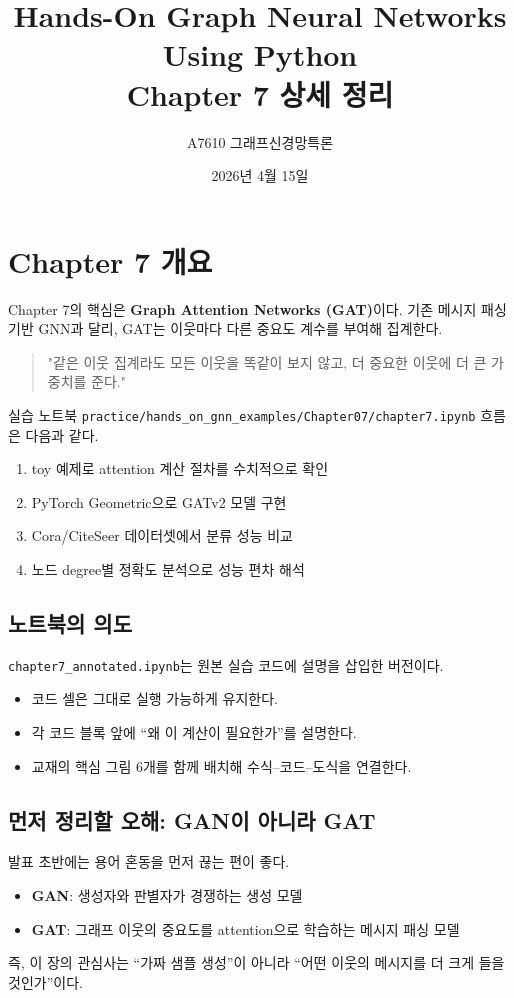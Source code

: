 \documentclass[11pt,a4paper]{article}
\title{Hands-On Graph Neural Networks Using Python\\Chapter 7 상세 정리}
\author{A7610 그래프신경망특론}
\date{2026년 4월 15일}
\begin{document}
\maketitle
\tableofcontents
\newpage

\section{Chapter 7 개요}

Chapter 7의 핵심은 \textbf{Graph Attention Networks (GAT)}이다. 기존 메시지 패싱 기반 GNN과 달리, GAT는 이웃마다 다른 중요도 계수를 부여해 집계한다.

\begin{quote}
"같은 이웃 집계라도 모든 이웃을 똑같이 보지 않고, 더 중요한 이웃에 더 큰 가중치를 준다."
\end{quote}

실습 노트북 \texttt{practice/hands\_on\_gnn\_examples/Chapter07/chapter7.ipynb} 흐름은 다음과 같다.
\begin{enumerate}[leftmargin=*]
  \item toy 예제로 attention 계산 절차를 수치적으로 확인
  \item PyTorch Geometric으로 GATv2 모델 구현
  \item Cora/CiteSeer 데이터셋에서 분류 성능 비교
  \item 노드 degree별 정확도 분석으로 성능 편차 해석
\end{enumerate}

\subsection*{노트북의 의도}
\texttt{chapter7\_annotated.ipynb}는 원본 실습 코드에 설명을 삽입한 버전이다.
\begin{itemize}[leftmargin=*]
  \item 코드 셀은 그대로 실행 가능하게 유지한다.
  \item 각 코드 블록 앞에 ``왜 이 계산이 필요한가''를 설명한다.
  \item 교재의 핵심 그림 6개를 함께 배치해 수식--코드--도식을 연결한다.
\end{itemize}

\subsection*{먼저 정리할 오해: GAN이 아니라 GAT}
발표 초반에는 용어 혼동을 먼저 끊는 편이 좋다.
\begin{itemize}[leftmargin=*]
  \item \textbf{GAN}: 생성자와 판별자가 경쟁하는 생성 모델
  \item \textbf{GAT}: 그래프 이웃의 중요도를 attention으로 학습하는 메시지 패싱 모델
\end{itemize}
즉, 이 장의 관심사는 ``가짜 샘플 생성''이 아니라 ``어떤 이웃의 메시지를 더 크게 들을 것인가''이다.
\end{document}
